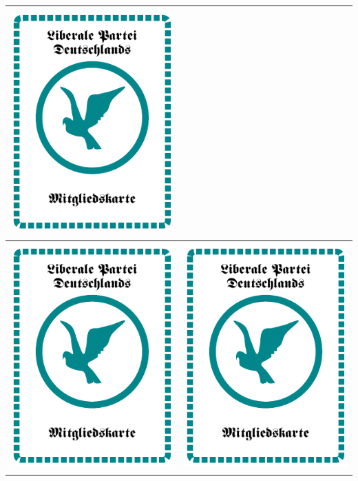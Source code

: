 \documentclass[12pt,a4paper,spanish]{article}
\begin{document}
\begin{table}
\begin{tabular}{|c|c|}
			\includegraphics[height=8.7cm, angle=90]{./Drawings/party_liberal.pdf} \\
			\midrule
			\includegraphics[height=8.7cm, angle=90]{./Drawings/party_liberal.pdf} &
			\includegraphics[height=8.7cm, angle=90]{./Drawings/party_liberal.pdf} \\
			\bottomrule
		\end{tabular}
	

\end{table}
\end{document}
